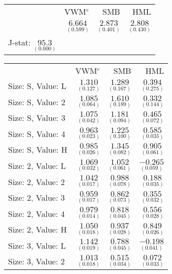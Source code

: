 \documentclass[a4paper]{article}
\begin{document}
\begin{center}
\begin{tabular}{lrrr} \toprule
 & VWM$^e$ & SMB & HML\\ \cmidrule{2-4}
 & $\underset{(0.599)}{6.664}$ & $\underset{(0.401)}{2.873}$ & $\underset{(0.430)}{2.808}$
\\
J-stat: $\underset{(0.000)}{95.3}$ \\
\bottomrule \end{tabular}
\end{center}
\newpage
\begin{center}
\begin{tabular}{lrrr} \toprule
 & VWM$^e$ & SMB & HML\\ \cmidrule{2-4}
Size: S, Value: L  & $\underset{(0.127)}{ 1.310}$ & $\underset{(0.167)}{ 1.289}$ & $\underset{(0.275)}{ 0.394}$\\ 
Size: S, Value: 2  & $\underset{(0.064)}{ 1.085}$ & $\underset{(0.189)}{ 1.610}$ & $\underset{(0.144)}{ 0.332}$\\ 
Size: S, Value: 3  & $\underset{(0.042)}{ 1.075}$ & $\underset{(0.094)}{ 1.181}$ & $\underset{(0.072)}{ 0.465}$\\ 
Size: S, Value: 4  & $\underset{(0.023)}{ 0.963}$ & $\underset{(0.100)}{ 1.225}$ & $\underset{(0.035)}{ 0.585}$\\ 
Size: S, Value: H  & $\underset{(0.026)}{ 0.985}$ & $\underset{(0.082)}{ 1.345}$ & $\underset{(0.061)}{ 0.905}$\\ 
\cmidrule{2-4}
Size: 2, Value: L  & $\underset{(0.032)}{ 1.069}$ & $\underset{(0.061)}{ 1.052}$ & $\underset{(0.059)}{-0.265}$\\ 
Size: 2, Value: 2  & $\underset{(0.017)}{ 1.042}$ & $\underset{(0.078)}{ 0.988}$ & $\underset{(0.035)}{ 0.188}$\\ 
Size: 2, Value: 3  & $\underset{(0.017)}{ 0.959}$ & $\underset{(0.073)}{ 0.862}$ & $\underset{(0.032)}{ 0.355}$\\ 
Size: 2, Value: 4  & $\underset{(0.014)}{ 0.979}$ & $\underset{(0.045)}{ 0.818}$ & $\underset{(0.028)}{ 0.556}$\\ 
Size: 2, Value: H  & $\underset{(0.018)}{ 1.050}$ & $\underset{(0.028)}{ 0.937}$ & $\underset{(0.026)}{ 0.849}$\\ 
\cmidrule{2-4}
Size: 3, Value: L  & $\underset{(0.019)}{ 1.142}$ & $\underset{(0.045)}{ 0.788}$ & $\underset{(0.041)}{-0.198}$\\ 
Size: 3, Value: 2  & $\underset{(0.018)}{ 1.013}$ & $\underset{(0.034)}{ 0.515}$ & $\underset{(0.033)}{ 0.072}$\\ 

\end{tabular}
\end{center}
\end{document}
